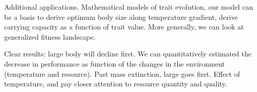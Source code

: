 Additional applications.
Mathematical models of trait evolution, our model can be a basis to derive optimum body size along temperature gradient, derive carrying capacity as a function of trait value. 
More generally, we can look at generalized fitness landscape.

Clear results: large body will decline first. 
We can quantitatively estimated the decrease in performance as function of the changes in the environment  (temperature and resource).
Past mass extinction, large goes first.
Effect of temperature, and pay closer attention to resource quantity and quality.


%


%
%
%
%
%
%  

